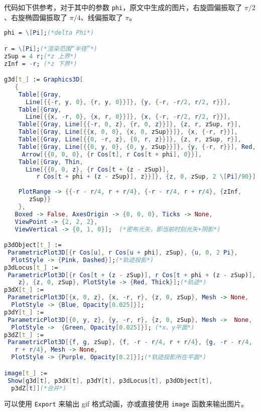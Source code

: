 
代码如下供参考，对于其中的参数 \verb`phi`，原文中生成的图片，右旋圆偏振取了 $\pi/2$、右旋椭圆偏振取了 $\pi/4$、线偏振取了 $\pi$。

\begin{lstlisting}[language=Mathematica]
phi = \[Pi];(*delta Phi*)

r = \[Pi];(*渲染范围“半径”*)
zSup = 4 r;(*z 上界*)
zInf = -r; (*z 下界*)

g3d[t_] := Graphics3D[
   {
    Table[{Gray, 
      Line[{{-r, y, 0}, {r, y, 0}}]}, {y, {-r, -r/2, r/2, r}}],
    Table[{Gray, 
      Line[{{x, -r, 0}, {x, r, 0}}]}, {x, {-r, -r/2, r/2, r}}],
    Table[{Gray, Line[{{-r, 0, z}, {r, 0, z}}]}, {z, r, zSup, r}],
    Table[{Gray, Line[{{x, 0, 0}, {x, 0, zSup}}]}, {x, {-r, r}}],
    Table[{Gray, Line[{{0, -r, z}, {0, r, z}}]}, {z, r, zSup, r}],
    Table[{Gray, Line[{{0, y, 0}, {0, y, zSup}}]}, {y, {-r, r}}], Red,
     Arrow[{{0, 0, 0}, {r Cos[t], r Cos[t + phi], 0}}],
    Table[{Gray, Thin, 
      Line[{{0, 0, z}, {r Cos[t + (z - zSup)], 
         r Cos[t + phi + (z - zSup)], z}}]}, {z, 0, zSup, 2 \[Pi]/90}],
    
    PlotRange -> {{-r - r/4, r + r/4}, {-r - r/4, r + r/4}, {zInf, 
       zSup}}
    }, 
   Boxed -> False, AxesOrigin -> {0, 0, 0}, Ticks -> None, 
   ViewPoint -> {2, 2, 2}, 
   ViewVertical -> {0, 1, 0}];  (*密布光矢，即当前时刻光矢+阴影*)

p3dObject[t_] := 
 ParametricPlot3D[{r Cos[u], r Cos[u + phi], zSup}, {u, 0, 2 Pi}, 
  PlotStyle -> {Pink, Dashed}];(*轨迹投影*)
p3dLocus[t_] := 
 ParametricPlot3D[{r Cos[t + (z - zSup)], r Cos[t + phi + (z - zSup)],
    z}, {z, 0, zSup}, PlotStyle -> {Red, Thick}];(*轨迹*)
p3dX[t_] := 
 ParametricPlot3D[{x, 0, z}, {x, -r, r}, {z, 0, zSup}, Mesh -> None, 
  PlotStyle -> {Blue, Opacity[0.025]}];
p3dY[t_] := 
 ParametricPlot3D[{0, y, z}, {y, -r, r}, {z, 0, zSup}, Mesh ->  None, 
  PlotStyle ->  {Green, Opacity[0.025]}]; (*x、y平面*)
p3dZ[t_] := 
 ParametricPlot3D[{f, g, zSup}, {f, -r - r/4, r + r/4}, {g, -r - r/4, 
   r + r/4}, Mesh -> None, 
  PlotStyle -> {Purple, Opacity[0.2]}];(*轨迹投影所在平面*)

image[t_] := 
 Show[g3d[t], p3dX[t], p3dY[t], p3dLocus[t], p3dObject[t], 
  p3dZ[t]](*合并*)
\end{lstlisting}

可以使用 \verb`Export` 来输出 gif 格式动画，亦或直接使用 \verb`image` 函数来输出图片。